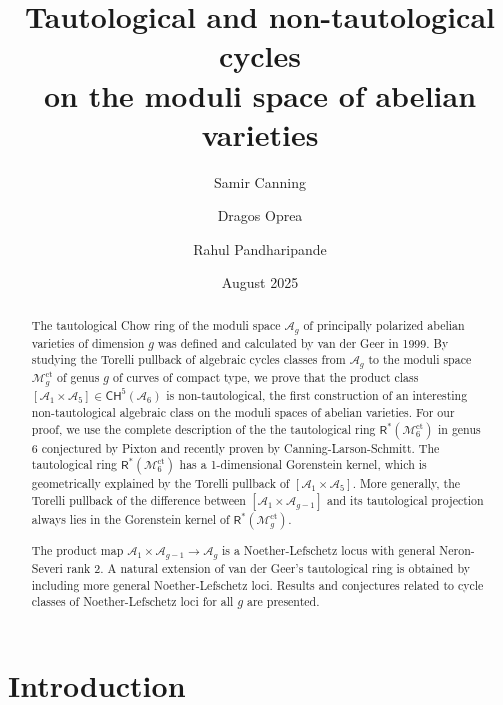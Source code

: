 \documentclass[11pt]{amsart}
\title[Tautological and
non-tautological cycles on the moduli space of abelian varieties]{Tautological and non-tautological cycles\\ on the moduli space of abelian varieties}
\author{Samir Canning}
\author{Dragos Oprea}
\author{Rahul Pandharipande}
\date{}
\theoremstyle{definition}
\DeclareMathOperator{\ct}{ct}
\begin{document}
\baselineskip=17pt
\normalbaselineskip


\begin{abstract} 
The tautological Chow ring of the moduli space 
$\mathcal{A}_g$
of
principally polarized abelian varieties of dimension $g$ was defined and calculated 
by van der Geer in 1999. 
By studying the Torelli pullback of algebraic
cycles classes from $\mathcal{A}_g$ to
the moduli space 
$\mathcal{M}_g^{\ct}$
of genus $g$
of curves 
of compact type, 
 we prove that the product class 
$[\mathcal{A}_1\times \mathcal{A}_5]\in \mathsf{CH}^{5}(\mathcal{A}_6)$
is non-tautological, the first
construction of an interesting non-tautological algebraic class on 
the moduli spaces of abelian varieties. 
For our proof, we use the complete description of
the the tautological ring $\mathsf{R}^*(\mathcal{M}_6^{\ct})$
in genus 6
conjectured by Pixton and recently proven by Canning-Larson-Schmitt. The tautological ring $\mathsf{R}^*(\mathcal{M}_6^{\ct})$
has a 1-dimensional Gorenstein kernel, which is geometrically
explained by the Torelli pullback of $[\mathcal{A}_1\times \mathcal{A}_5]$. More generally, the Torelli pullback of the difference between $[\mathcal{A}_1\times \mathcal{A}_{g-1}]$ and its tautological projection always lies in the Gorenstein kernel of 
$\mathsf{R}^*(\mathcal{M}_g^{\ct})$.

The product map $\mathcal{A}_1\times \mathcal{A}_{g-1}\rightarrow \mathcal{A}_g$ is a Noether-Lefschetz locus with general Neron-Severi rank 2. A natural extension
of van der Geer's tautological ring is
obtained by including more general Noether-Lefschetz
loci.
Results and conjectures related to cycle classes of 
Noether-Lefschetz loci
for all $g$ are presented. 
\end{abstract}

\date{August 2025}
\maketitle
\setcounter{tocdepth}{1}
\tableofcontents{}
\section{Introduction}
 
\end{document}
